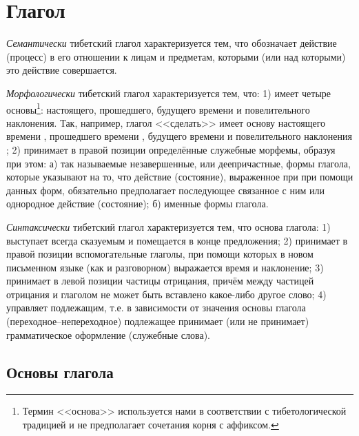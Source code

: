 \section{Глагол}

\emph{Семантически} тибетский глагол характеризуется тем, что обозначает действие (процесс) в его отношении к лицам и предметам, которыми (или над которыми) это действие совершается.

\emph{Морфологически} тибетский глагол характеризуется тем, что: 1) имеет четыре основы\footnote[32]{Термин <<основа>> используется нами в соответствии с тибетологической традицией и не предполагает сочетания корня с аффиксом.}: настоящего, прошедшего, будущего времени и повелительного наклонения. Так, например, глагол <<сделать>> имеет основу настоящего времени , прошедшего времени , будущего времени  и повелительного наклонения ; 2) принимает в правой позиции определённые служебные морфемы, образуя при этом: а) так называемые незавершенные, или деепричастные, формы глагола, которые указывают на то, что действие (состояние), выраженное при при помощи данных форм, обязательно предполагает последующее связанное с ним или однородное действие (состояние); б) именные формы глагола.

\emph{Синтаксически} тибетский глагол характеризуется тем, что основа глагола: 1) выступает всегда сказуемым и помещается в конце предложения; 2) принимает в правой позиции вспомогательные глаголы, при помощи которых в новом письменном языке (как и разговорном) выражается время и наклонение; 3) принимает в левой позиции частицы отрицания, причём между частицей отрицания и глаголом не может быть вставлено какое-либо другое слово; 4) управляет подлежащим, т.е. в зависимости от значения основы глагола (переходное--непереходное) подлежащее принимает (или не принимает) грамматическое оформление (служебные слова).

\subsection{Основы глагола}

